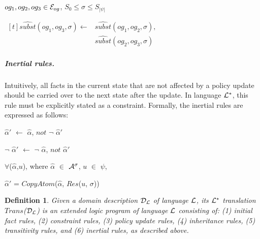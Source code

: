 \documentclass[11pt, twocolumn]{article}
\newtheorem{vdefinition}{Definition}
\newenvironment{vquote}
  {\begin{list}{}{\leftmargin 1em}\item[]}
  {\end{list}}
\begin{document}
\begin{enumerate}
                $og_{1}, og_{2}, og_{3} \in {\cal E}_{og}$,
                $S_{0} \leq \sigma \leq S_{|\psi|}$

                \begin{math}
                  \begin{aligned}[t]
                    \hat{subst}(og_{1}, og_{3}, \sigma) \leftarrow &
                    \hat{subst}(og_{1}, og_{2}, \sigma), \\
                    & \hat{subst}(og_{2}, og_{3}, \sigma)
                  \end{aligned}
                \end{math}
            \end{enumerate}

          \subparagraph{Inertial rules.}

            Intuitively, all facts in the current state that are not affected
            by a policy update should be carried over to the next state after
            the update. In language ${\cal L}^{*}$, this rule must be
            explicitly stated as a constraint. Formally, the inertial rules
            are expressed as follows:

            \begin{vquote}
              $\hat{\alpha}'$ $\leftarrow$ $\hat{\alpha}$, $not$ $\lnot$ $\hat{\alpha}'$

              $\lnot$ $\hat{\alpha}'$ $\leftarrow$ $\lnot$ $\hat{\alpha}$, $not$ $\hat{\alpha}'$

              $\forall$($\hat{\alpha}$,$u$), where
              $\hat{\alpha}$ $\in$ ${\cal A}^{\sigma}$,
              $u$ $\in$ $\psi$,

              $\hat{\alpha}'$ = $CopyAtom$($\hat{\alpha}$, $Res$($u$, $\sigma$))
            \end{vquote}

        \begin{vdefinition}
          Given a domain description ${\cal D_{L}}$ of language ${\cal L}$, its
          ${\cal L^{*}}$ translation $Trans$(${\cal D_{L}}$) is an extended
          logic program of language ${\cal L}$ consisting of: (1) initial fact
          rules, (2) constraint rules, (3) policy update rules, (4) inheritance
          rules, (5) transitivity rules, and (6) inertial rules, as described
          above.
        \end{vdefinition}
\end{document}
